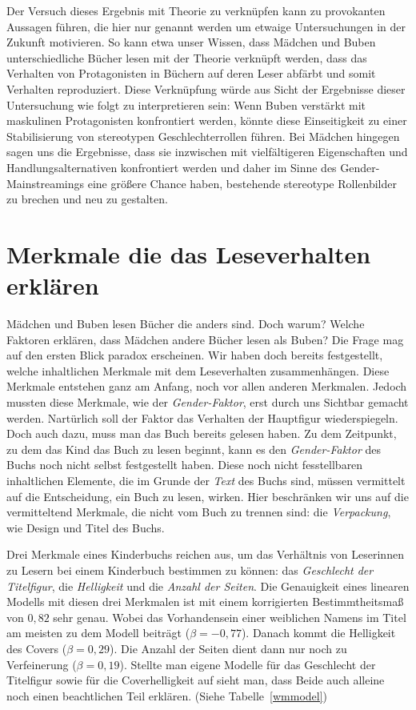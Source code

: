 Der Versuch dieses Ergebnis mit Theorie zu verknüpfen kann zu
provokanten Aussagen führen, die hier nur genannt werden um etwaige
Untersuchungen in der Zukunft motivieren. So kann etwa unser Wissen,
dass Mädchen und Buben unterschiedliche Bücher lesen mit der Theorie
verknüpft werden, dass das Verhalten von Protagonisten in Büchern auf
deren Leser abfärbt und somit Verhalten reproduziert. Diese Verknüpfung
würde aus Sicht der Ergebnisse dieser Untersuchung wie folgt zu
interpretieren sein: Wenn Buben verstärkt mit maskulinen Protagonisten
konfrontiert werden, könnte diese Einseitigkeit zu einer Stabilisierung
von stereotypen Geschlechterrollen führen. Bei Mädchen hingegen sagen
uns die Ergebnisse, dass sie inzwischen mit vielfältigeren Eigenschaften
und Handlungsalternativen konfrontiert werden und daher im Sinne des
Gender-Mainstreamings eine größere Chance haben, bestehende stereotype
Rollenbilder zu brechen und neu zu gestalten.

\chapter{Merkmale die das Leseverhalten erklären}

Mädchen und Buben lesen Bücher die anders sind. Doch warum? Welche
Faktoren erklären, dass Mädchen andere Bücher lesen als Buben? Die Frage
mag auf den ersten Blick paradox erscheinen. Wir haben doch bereits
festgestellt, welche inhaltlichen Merkmale mit dem Leseverhalten
zusammenhängen. Diese Merkmale entstehen ganz am Anfang, noch vor allen
anderen Merkmalen. Jedoch mussten diese Merkmale, wie \zB der
\emph{Gender-Faktor}, erst durch uns Sichtbar gemacht werden. Nartürlich
soll der Faktor das Verhalten der Hauptfigur wiederspiegeln. Doch auch
dazu, muss man das Buch bereits gelesen haben. Zu dem Zeitpunkt, zu dem
das Kind das Buch zu lesen beginnt, kann es den \emph{Gender-Faktor} des
Buchs noch nicht selbst festgestellt haben. Diese noch nicht
fesstellbaren inhaltlichen Elemente, die im Grunde der \emph{Text} des
Buchs sind, müssen vermittelt auf die Entscheidung, ein Buch zu lesen,
wirken. Hier beschränken wir uns auf die vermitteltend Merkmale, die
nicht vom Buch zu trennen sind: die \emph{Verpackung}, wie \zB Design
und Titel des Buchs.

Drei Merkmale eines Kinderbuchs reichen aus, um das Verhältnis von
Leserinnen zu Lesern bei einem Kinderbuch bestimmen zu können: das
\emph{Geschlecht der Titelfigur}, die \emph{Helligkeit} und die
\emph{Anzahl der Seiten}. Die Genauigkeit eines linearen Modells mit
diesen drei Merkmalen ist mit einem korrigierten Bestimmtheitsmaß von
$0{,}82$ sehr genau. Wobei das Vorhandensein einer weiblichen Namens im
Titel am meisten zu dem Modell beiträgt ($\beta=-0{,}77$). Danach kommt
die Helligkeit des Covers ($\beta=0{,}29$). Die Anzahl der Seiten dient
dann nur noch zu Verfeinerung ($\beta=0{,}19$). Stellte man eigene
Modelle für das Geschlecht der Titelfigur sowie für die Coverhelligkeit
auf sieht man, dass Beide auch alleine noch einen beachtlichen Teil
erklären. (Siehe Tabelle~\ref{wmmodel})

